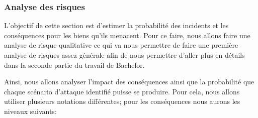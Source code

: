 \subsubsection{Analyse des risques}
L'objectif de cette section est d'estimer la probabilité des incidents et les conséquences pour les biens qu'ils menacent. Pour ce faire, nous allons faire une analyse de risque qualitative ce qui va nous permettre de faire une première analyse de risques assez générale afin de nous permettre d'aller plus en détails dans la seconde partie du travail de Bachelor.

Ainsi, nous allons analyser l'impact des conséquences ainsi que la probabilité que chaque scénario d'attaque identifié puisse se produire. Pour cela, nous allons utiliser plusieurs notations différentes; pour les conséquences nous aurons les niveaux suivants:

